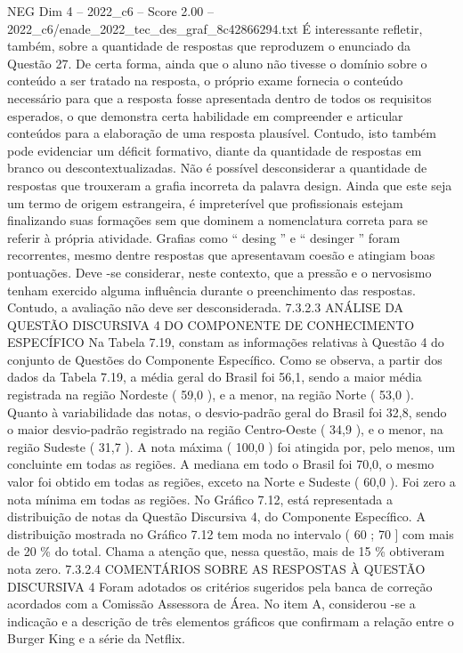 \begin{textsample}{NEG Dim 4 – 2022\_c6 – Score 2.00 – 2022\_c6/enade\_2022\_tec\_des\_graf\_8c42866294.txt}
É interessante refletir, também, sobre a quantidade de respostas que reproduzem o enunciado da Questão 27.
De certa forma, ainda que o aluno não tivesse o domínio sobre o conteúdo a ser tratado na resposta, o próprio exame fornecia o conteúdo necessário para que a resposta fosse apresentada dentro de todos os requisitos esperados, o que demonstra certa habilidade em compreender e articular conteúdos para a elaboração de uma resposta plausível.
Contudo, isto também pode evidenciar um déficit formativo, diante da quantidade de respostas em branco ou descontextualizadas.
Não é possível desconsiderar a quantidade de respostas que trouxeram a grafia incorreta da palavra design.
Ainda que este seja um termo de origem estrangeira, é impreterível que profissionais estejam finalizando suas formações sem que dominem a nomenclatura correta para se referir à própria atividade.
Grafias como “ desing ” e “ desinger ” foram recorrentes, mesmo dentre respostas que apresentavam coesão e atingiam boas pontuações.
Deve -se considerar, neste contexto, que a pressão e o nervosismo tenham exercido alguma influência durante o preenchimento das respostas.
Contudo, a avaliação não deve ser desconsiderada. 7.3.2.3 ANÁLISE DA QUESTÃO DISCURSIVA 4 DO COMPONENTE DE CONHECIMENTO ESPECÍFICO Na Tabela 7.19, constam as informações relativas à Questão 4 do conjunto de Questões do Componente Específico.
Como se observa, a partir dos dados da Tabela 7.19, a média geral do Brasil foi 56,1, sendo a maior média registrada na região Nordeste ( 59,0 ), e a menor, na região Norte ( 53,0 ).
Quanto à variabilidade das notas, o desvio-padrão geral do Brasil foi 32,8, sendo o maior desvio-padrão registrado na região Centro-Oeste ( 34,9 ), e o menor, na região Sudeste ( 31,7 ).
A nota máxima ( 100,0 ) foi atingida por, pelo menos, um concluinte em todas as regiões.
A mediana em todo o Brasil foi 70,0, o mesmo valor foi obtido em todas as regiões, exceto na Norte e Sudeste ( 60,0 ).
Foi zero a nota mínima em todas as regiões.
No Gráfico 7.12, está representada a distribuição de notas da Questão Discursiva 4, do Componente Específico.
A distribuição mostrada no Gráfico 7.12 tem moda no intervalo ( 60 ; 70 ] com mais de 20 \% do total.
Chama a atenção que, nessa questão, mais de 15 \% obtiveram nota zero. 7.3.2.4 COMENTÁRIOS SOBRE AS RESPOSTAS À QUESTÃO DISCURSIVA 4 Foram adotados os critérios sugeridos pela banca de correção acordados com a Comissão Assessora de Área.
No item A, considerou -se a indicação e a descrição de três elementos gráficos que confirmam a relação entre o Burger King e a série da Netflix.

\end{textsample}
